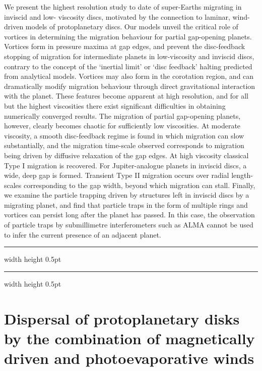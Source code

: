 \documentclass[a4paper,11pt]{book}
\def\doubleline{
\hrule width \hsize height 0.5pt  \kern 1mm \hrule width \hsize height 0.5pt 
}
\begin{document}
\vspace{2 mm}
\noindent We present the highest resolution study to date of super-Earths migrating in inviscid and low- viscosity discs, motivated by the connection to laminar, wind-driven models of protoplanetary discs. Our models unveil the critical role of vortices in determining the migration behaviour for partial gap-opening planets. Vortices form in pressure maxima at gap edges, and prevent the disc-feedback stopping of migration for intermediate planets in low-viscosity and inviscid discs, contrary to the concept of the ‘inertial limit’ or ‘disc feedback’ halting predicted from analytical models. Vortices may also form in the corotation region, and can dramatically modify migration behaviour through direct gravitational interaction with the planet. These features become apparent at high resolution, and for all but the highest viscosities there exist significant difficulties in obtaining numerically converged results. The migration of partial gap-opening planets, however, clearly becomes chaotic for sufficiently low viscosities. At moderate viscosity, a smooth disc-feedback regime is found in which migration can slow substantially, and the migration time-scale observed corresponds to migration being driven by diffusive relaxation of the gap edges. At high viscosity classical Type I migration is recovered. For Jupiter-analogue planets in inviscid discs, a wide, deep gap is formed. Transient Type II migration occurs over radial length-scales corresponding to the gap width, beyond which migration can stall. Finally, we examine the particle trapping driven by structures left in inviscid discs by a migrating planet, and find that particle traps in the form of multiple rings and vortices can persist long after the planet has passed. In this case, the observation of particle traps by submillimetre interferometers such as ALMA cannot be used to infer the current presence of an adjacent planet. 

\noindent\doubleline
        
          \section[Dispersal of protoplanetary disks by the combination of magnetically driven and photoevaporative winds \newline(M. Kunitomo)] { Dispersal of protoplanetary disks by the combination of magnetically driven and photoevaporative winds }
\end{document}
